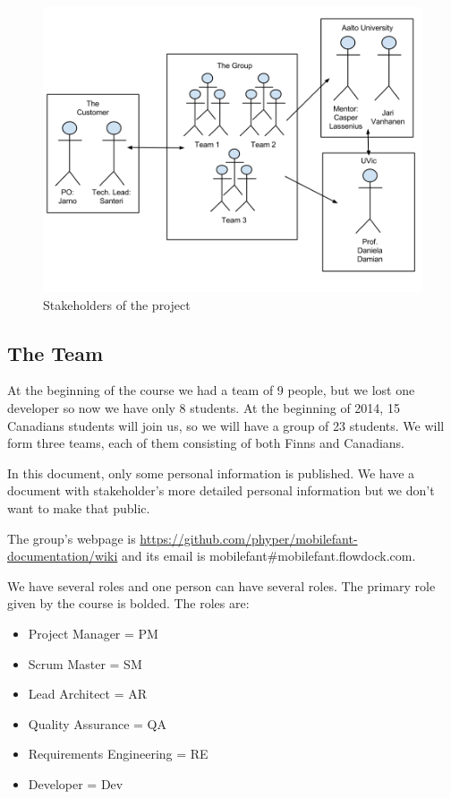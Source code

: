 \begin{figure}[H]
\centering
\includegraphics[width=1\textwidth]{imgs/stakeholders.png}
\caption{Stakeholders of the project}
\label{fig:stakeholders}
\end{figure}

\subsection{The Team}

At the beginning of the course we had a team of 9 people, but we lost one
developer so now we have only 8 students. At the beginning of 2014, 15 Canadians
students will join us, so we will have a group of 23 students. We will form
three teams, each of them consisting of both Finns and Canadians.

In this document, only some personal information is published. We have a
document with stakeholder's more detailed personal information but we don't want
to make that public.

The group's webpage is
\href{https://github.com/phyper/mobilefant-documentation/wiki}{https://github.com/phyper/mobilefant-documentation/wiki}
and its email is mobilefant\#mobilefant.flowdock.com.

We have several roles and one person can have several roles. The primary role
given by the course is bolded. The roles are:

\begin{itemize}
  \item Project Manager = PM
  \item Scrum Master = SM
  \item Lead Architect = AR
  \item Quality Assurance = QA
  \item Requirements Engineering = RE
  \item Developer = Dev
\end{itemize}

